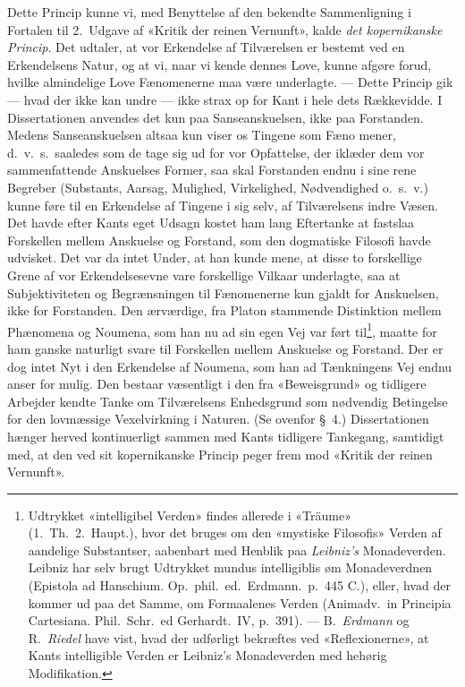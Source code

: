 \documentclass[12pt,a4paper]{article}
\newcommand{\opage}[1]{\marginnote{\footnotesize\textit{[#1]}}}
\begin{document}
Dette Princip kunne vi, med Benyttelse af den bekendte Sammenligning i
Fortalen til 2.\ Udgave af «Kritik der reinen Vernunft», kalde \emph{det
kopernikanske Princip}. Det udtaler, at vor Erkendelse af Tilværelsen er
bestemt ved en Erkendelsens Natur, og at vi, naar vi kende dennes Love,
kunne afgøre forud, hvilke almindelige Love Fænomenerne maa være
underlagte. --- Dette Princip gik --- hvad der ikke kan undre --- ikke
strax op for Kant i hele dets Rækkevidde. I Dissertationen anvendes det
kun paa Sanseanskuelsen, ikke paa Forstanden. Medens Sanseanskuelsen
altsaa kun viser os Tingene som  Fæno%
\opage{50}mener, d.\ v.\ s.\ saaledes som de
tage sig ud for vor Opfattelse, der iklæder dem vor sammenfattende
Anskuelses Former, saa skal Forstanden endnu i sine rene Begreber
(Substants, Aarsag, Mulighed, Virkelighed, Nødvendighed o.\ s.\ v.) kunne
føre til en Erkendelse af Tingene i sig selv, af Tilværelsens indre Væsen.
Det havde efter Kants eget Udsagn kostet ham lang Eftertanke at fastslaa
Forskellen mellem Anskuelse og Forstand, som den dogmatiske Filosofi
havde udvisket. Det var da intet Under, at han kunde mene, at disse to
forskellige Grene af vor Erkendelsesevne vare forskellige Vilkaar
underlagte, saa at Subjektiviteten og Begrænsningen til Fænomenerne kun
gjaldt for Anskuelsen, ikke for Forstanden. Den ærværdige, fra Platon
stammende Distinktion mellem Phænomena og Noumena, som
han nu ad sin egen Vej var ført til\footnote{Udtrykket «intelligibel
Verden» findes allerede i «Träume» (1.\ Th.\ 2.\ Haupt.), hvor det
bruges om den «mystiske Filosofis» Verden af aandelige Substantser,
aabenbart med Henblik paa \emph{Leibniz's} Monadeverden. Leibniz har selv brugt
Udtrykket mundus intelligiblis øm Monadeverdnen (Epistola ad
Hanschium. Op.\ phil.\ ed.\ Erdmann.\ p.\ 445 C.), eller, hvad der kommer
ud paa det Samme, om Formaalenes Verden (Animadv.\ in Principia Cartesiana.
Phil.\ Schr.\ ed Gerhardt.\ IV, p.\ 391). --- B.\ \emph{Erdmann} og R.\ \emph{Riedel}
have vist, hvad der udførligt bekræftes ved «Reflexionerne», at Kants
intelligible Verden er Leibniz's Monadeverden med hehørig Modifikation.},
maatte for ham ganske naturligt svare til Forskellen mellem Anskuelse og
Forstand. Der er dog intet Nyt i den Erkendelse af Noumena, som han ad
Tænkningens Vej endnu anser for mulig. Den bestaar væsentligt i den fra
«Beweisgrund» og tidligere Arbejder kendte Tanke om Tilværelsens
Enhedsgrund som nødvendig Betingelse for den lovmæssige Vexelvirkning i
Naturen. (Se ovenfor §\ 4.) Dissertationen hænger herved kontinuerligt
sammen med Kants tidligere Tankegang, samtidigt med, at den ved sit
kopernikanske Princip peger frem mod «Kritik der reinen Vernunft».
\end{document}
